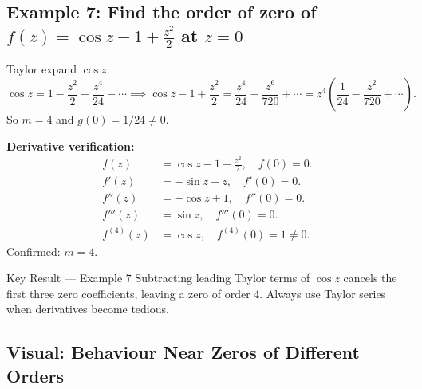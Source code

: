 \documentclass[12pt,a4paper]{article}
\begin{document}
\subsection*{Example 7: Find the order of zero of $f(z)=\cos z - 1 + \tfrac{z^2}{2}$ at $z=0$}

Taylor expand $\cos z$:
\[
  \cos z = 1 - \frac{z^2}{2} + \frac{z^4}{24} - \cdots
  \implies \cos z - 1 + \frac{z^2}{2} = \frac{z^4}{24} - \frac{z^6}{720} + \cdots = z^4\!\left(\frac{1}{24} - \frac{z^2}{720}+\cdots\right).
\]
So $m=4$ and $g(0)=1/24\neq 0$.

\medskip\noindent\textbf{Derivative verification:}
\begin{align*}
  f(z) &= \cos z - 1 + \tfrac{z^2}{2},\quad f(0)=0.\\
  f'(z) &= -\sin z + z,\quad f'(0)=0.\\
  f''(z) &= -\cos z + 1,\quad f''(0)=0.\\
  f'''(z) &= \sin z,\quad f'''(0)=0.\\
  f^{(4)}(z) &= \cos z,\quad f^{(4)}(0)=1\neq 0.
\end{align*}
Confirmed: $m=4$.

\begin{learnbox}{Key Result --- Example 7}
Subtracting leading Taylor terms of $\cos z$ cancels the first three zero coefficients,
leaving a zero of order 4. Always use Taylor series when derivatives become tedious.
\end{learnbox}

\subsection*{Visual: Behaviour Near Zeros of Different Orders}

\begin{center}
\end{center}
\end{document}
